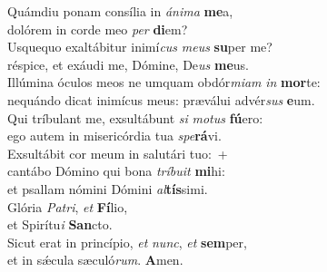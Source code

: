 \evenverse Quámdiu ponam consília in \textit{á}\textit{ni}\textit{ma} \textbf{me}a,~\*\\
\evenverse dolórem in corde meo \textit{per} \textbf{di}em?\\
\oddverse Usquequo exaltábitur inimí\textit{cus} \textit{me}\textit{us} \textbf{su}per me?~\*\\
\oddverse réspice, et exáudi me, Dómine, De\textit{us} \textbf{me}us.\\
\evenverse Illúmina óculos meos ne umquam obdór\textit{mi}\textit{am} \textit{in} \textbf{mor}te:~\*\\
\evenverse nequándo dicat inimícus meus: præválui advér\textit{sus} \textbf{e}um.\\
\oddverse Qui tríbulant me, exsultábunt \textit{si} \textit{mo}\textit{tus} \textbf{fú}ero:~\*\\
\oddverse ego autem in misericórdia tua \textit{spe}\textbf{rá}vi.\\
\evenverse Exsultábit cor meum in salutári tuo:~+\\
\evenverse  cantábo Dómino qui bona \textit{trí}\textit{bu}\textit{it} \textbf{mi}hi:~\*\\
\evenverse et psallam nómini Dómini \textit{al}\textbf{tís}simi.\\
\oddverse Glória \textit{Pa}\textit{tri}, \textit{et} \textbf{Fí}lio,~\*\\
\oddverse et Spirítu\textit{i} \textbf{San}cto.\\
\evenverse Sicut erat in princípio, \textit{et} \textit{nunc}, \textit{et} \textbf{sem}per,~\*\\
\evenverse et in sǽcula sæculó\textit{rum}. \textbf{A}men.\\
